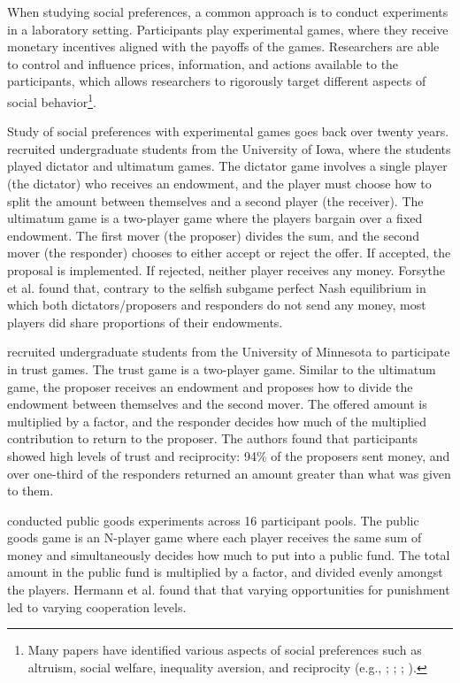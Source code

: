 \documentclass[12pt]{article}
\begin{document}
When studying social preferences, a common approach is to conduct experiments in a laboratory setting. Participants play experimental games, where they receive monetary incentives aligned with the payoffs of the games. Researchers are able to control and influence prices, information, and actions available to the participants, which allows researchers to rigorously target different aspects of social behavior\footnote{Many papers have identified various aspects of social preferences such as altruism, social welfare, inequality aversion, and reciprocity (e.g., \cite{charness_rabin_2002}; \cite{fehr_schmidt_1999}; \cite{rabin_1993}; \cite{fisman_jakiela_kariv_2014}).}.

Study of social preferences with experimental games goes back over twenty years. \cite{forsythe_1994} recruited undergraduate students from the University of Iowa, where the students played dictator and ultimatum games. The dictator game involves a single player (the dictator) who receives an endowment, and the player must choose how to split the amount between themselves and a second player (the receiver). The ultimatum game is a two-player game where the players bargain over a fixed endowment. The first mover (the proposer) divides the sum, and the second mover (the responder) chooses to either accept or reject the offer. If accepted, the proposal is implemented. If rejected, neither player receives any money. Forsythe et al. found that, contrary to the selfish subgame perfect Nash equilibrium in which both dictators/proposers and responders do not send any money, most players did share proportions of their endowments.

\cite{berg_1995} recruited undergraduate students from the University of Minnesota to participate in trust games. The trust game is a two-player game. Similar to the ultimatum game, the proposer receives an endowment and proposes how to divide the endowment between themselves and the second mover. The offered amount is multiplied by a factor, and the responder decides how much of the multiplied contribution to return to the proposer. The authors found that participants showed high levels of trust and reciprocity: 94\% of the proposers sent money, and over one-third of the responders returned an amount greater than what was given to them.

 \cite{hermann_thoni_gachter_2008} conducted public goods experiments across 16 participant pools. The public goods game is an N-player game where each player receives the same sum of money and simultaneously decides how much to put into a public fund. The total amount in the public fund is multiplied by a factor, and divided evenly amongst the players. Hermann et al. found that that varying opportunities for punishment led to varying cooperation levels.
\end{document}
